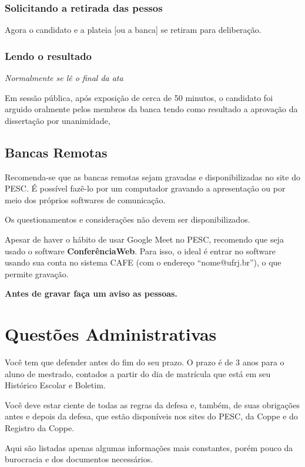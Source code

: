 \documentclass[a4paper,12pt]{article}
\begin{document}
\subsubsection{Solicitando a retirada das pessos}

Agora o candidato e a plateia [ou a banca] se retiram para deliberação.

\subsubsection{Lendo o resultado}

\textit{Normalmente se lê o final da ata}

Em sessão pública, após exposição de cerca de 50 minutos, o candidato foi arguido oralmente pelos membros da banca tendo como resultado a aprovação da dissertação por unanimidade, 

\subsection{Bancas Remotas}

Recomenda-se que as bancas remotas sejam gravadas e disponibilizadas no site do PESC. É possível fazê-lo por um computador gravando a apresentação ou por meio dos próprios softwares de comunicação.

Os questionamentos e considerações não devem ser disponibilizados.

Apesar de haver o hábito de usar Google Meet no PESC, recomendo que seja usado o software \textbf{ConferênciaWeb}. Para isso, o ideal é entrar no software usando sua conta no sistema CAFE (com o endereço ``nome@ufrj.br''), o que permite gravação. 

\textbf{Antes de gravar faça um aviso as pessoas. }

\section{Questões Administrativas}

Você tem que defender antes do fim do seu prazo. O prazo é de 3 anos para o aluno de mestrado, contados a partir do dia de matrícula que está em seu Histórico Escolar e Boletim.

Você deve estar ciente de todas as regras da defesa e, também, de suas obrigações antes e depois da defesa, que estão disponíveis nos sites do PESC, da Coppe e do Registro da Coppe.

Aqui são listadas apenas algumas informações mais constantes, porém pouco da burocracia e dos documentos necessários.
\end{document}
